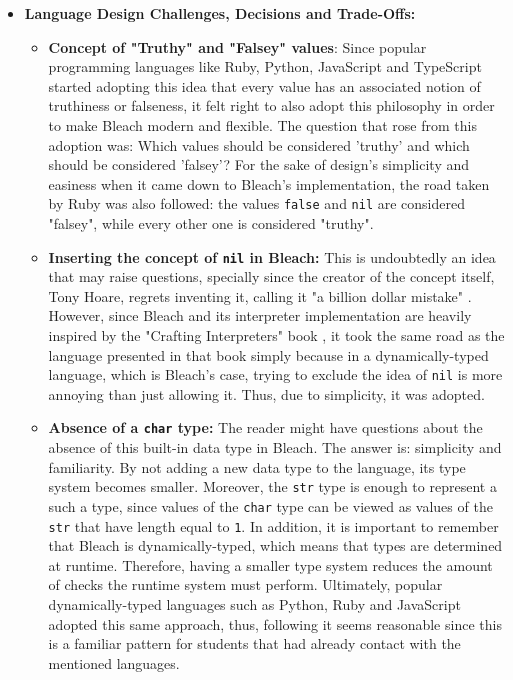 \begin{itemize}
    \item \textbf{Language Design Challenges, Decisions and Trade-Offs:}
    \begin{itemize}
        \item \textbf{Concept of "Truthy" and "Falsey" values}: Since popular programming languages like Ruby, Python, JavaScript and TypeScript started adopting this idea that every value has an associated notion of truthiness or falseness, it felt right to also adopt this philosophy in order to make Bleach modern and flexible. The question that rose from this adoption was: Which values should be considered 'truthy' and which should be considered 'falsey'? For the sake of design's simplicity and easiness when it came down to Bleach's implementation, the road taken by Ruby was also followed: the values \texttt{false} and \texttt{nil} are considered "falsey", while every other one is considered "truthy".
        
        \item \textbf{Inserting the concept of \texttt{nil} in Bleach:} This is undoubtedly an idea that may raise questions, specially since the creator of the concept itself, Tony Hoare, regrets inventing it, calling it "a billion dollar mistake" \cite{hoare_billion_dollar_mistake}. However, since Bleach and its interpreter implementation are heavily inspired by the "Crafting Interpreters" book \cite{nystrom2021crafting}, it took the same road as the language presented in that book simply because in a dynamically-typed language, which is Bleach's case, trying to exclude the idea of \texttt{nil} is more annoying than just allowing it. Thus, due to simplicity, it was adopted.
        
        \item \textbf{Absence of a \texttt{char} type:} The reader might have questions about the absence of this built-in data type in Bleach. The answer is: simplicity and familiarity. By not adding a new data type to the language, its type system becomes smaller. Moreover, the \texttt{str} type is enough to represent a such a type, since values of the \texttt{char} type can be viewed as values of the \texttt{str} that have length equal to \texttt{1}. In addition, it is important to remember that Bleach is dynamically-typed, which means that types are determined at runtime. Therefore, having a smaller type system reduces the amount of checks the runtime system must perform. Ultimately, popular dynamically-typed languages such as Python, Ruby and JavaScript adopted this same approach, thus, following it seems reasonable since this is a familiar pattern for students that had already contact with the mentioned languages.
        

\end{itemize}
\end{itemize}
